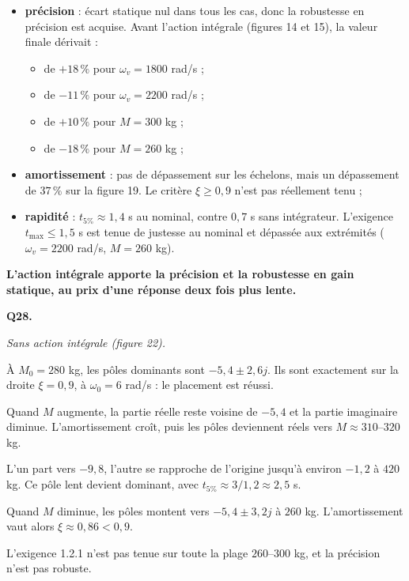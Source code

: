 \documentclass[11pt,a4paper]{article}
\providecommand{\tightlist}{\setlength{\itemsep}{0pt}\setlength{\parskip}{0pt}}
\renewcommand{\leq}{\leqslant}
\renewcommand{\geq}{\geqslant}
\begin{document}
\begin{itemize}
\tightlist
\item
  \textbf{précision} : écart statique nul dans tous les cas, donc la robustesse en précision est acquise. Avant l'action intégrale (figures 14 et 15), la valeur finale dérivait :

  \begin{itemize}
  \tightlist
  \item
    de \(+18\,\%\) pour \(\omega_v=1800\) rad/s ;
  \item
    de \(-11\,\%\) pour \(\omega_v=2200\) rad/s ;
  \item
    de \(+10\,\%\) pour \(M=300\) kg ;
  \item
    de \(-18\,\%\) pour \(M=260\) kg ;
  \end{itemize}
\item
  \textbf{amortissement} : pas de dépassement sur les échelons, mais un dépassement de \(37\,\%\) sur la figure 19. Le critère \(\xi\geq0{,}9\) n'est pas réellement tenu ;
\item
  \textbf{rapidité} : \(t_{5\%}\approx1{,}4\) s au nominal, contre \(0{,}7\) s sans intégrateur. L'exigence \(t_{\max}\leq1{,}5\) s est tenue de justesse au nominal et dépassée aux extrémités (\(\omega_v=2200\) rad/s, \(M=260\) kg).
\end{itemize}

\textbf{L'action intégrale apporte la précision et la robustesse en gain statique, au prix d'une réponse deux fois plus lente.}

\textbf{Q28.}

\emph{Sans action intégrale (figure 22).}

À \(M_0=280\) kg, les pôles dominants sont \(-5{,}4\pm2{,}6j\). Ils sont exactement sur la droite \(\xi=0{,}9\), à \(\omega_0=6\) rad/s : le placement est réussi.

Quand \(M\) augmente, la partie réelle reste voisine de \(-5{,}4\) et la partie imaginaire diminue. L'amortissement croît, puis les pôles deviennent réels vers \(M\approx310\)--\(320\) kg.

L'un part vers \(-9{,}8\), l'autre se rapproche de l'origine jusqu'à environ \(-1{,}2\) à \(420\) kg. Ce pôle lent devient dominant, avec \(t_{5\%}\approx3/1{,}2\approx2{,}5\) s.

Quand \(M\) diminue, les pôles montent vers \(-5{,}4\pm3{,}2j\) à \(260\) kg. L'amortissement vaut alors \(\xi\approx0{,}86<0{,}9\).

L'exigence 1.2.1 n'est pas tenue sur toute la plage \(260\)--\(300\) kg, et la précision n'est pas robuste.
\end{document}
